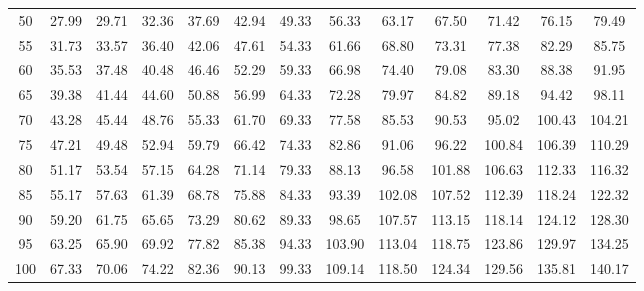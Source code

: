 \begin{center}
\begin{tabular}{c | c c c c c c c c c c c c}
50 & 27.99 & 29.71 & 32.36 & 37.69 & 42.94 & 49.33 & 56.33 & 63.17 & 67.50 & 71.42 & 76.15 & 79.49 \\
55 & 31.73 & 33.57 & 36.40 & 42.06 & 47.61 & 54.33 & 61.66 & 68.80 & 73.31 & 77.38 & 82.29 & 85.75 \\
60 & 35.53 & 37.48 & 40.48 & 46.46 & 52.29 & 59.33 & 66.98 & 74.40 & 79.08 & 83.30 & 88.38 & 91.95 \\
65 & 39.38 & 41.44 & 44.60 & 50.88 & 56.99 & 64.33 & 72.28 & 79.97 & 84.82 & 89.18 & 94.42 & 98.11 \\
70 & 43.28 & 45.44 & 48.76 & 55.33 & 61.70 & 69.33 & 77.58 & 85.53 & 90.53 & 95.02 & 100.43 & 104.21 \\
75 & 47.21 & 49.48 & 52.94 & 59.79 & 66.42 & 74.33 & 82.86 & 91.06 & 96.22 & 100.84 & 106.39 & 110.29 \\
80 & 51.17 & 53.54 & 57.15 & 64.28 & 71.14 & 79.33 & 88.13 & 96.58 & 101.88 & 106.63 & 112.33 & 116.32 \\
85 & 55.17 & 57.63 & 61.39 & 68.78 & 75.88 & 84.33 & 93.39 & 102.08 & 107.52 & 112.39 & 118.24 & 122.32 \\
90 & 59.20 & 61.75 & 65.65 & 73.29 & 80.62 & 89.33 & 98.65 & 107.57 & 113.15 & 118.14 & 124.12 & 128.30 \\
95 & 63.25 & 65.90 & 69.92 & 77.82 & 85.38 & 94.33 & 103.90 & 113.04 & 118.75 & 123.86 & 129.97 & 134.25 \\
100 & 67.33 & 70.06 & 74.22 & 82.36 & 90.13 & 99.33 & 109.14 & 118.50 & 124.34 & 129.56 & 135.81 & 140.17 \\
\end{tabular}
\end{center}
\renewcommand{\arraystretch}{1.5}
\setlength{\tabcolsep}{5pt}
